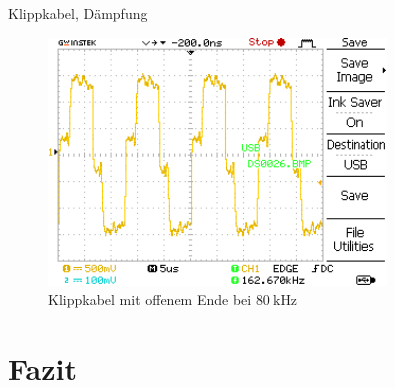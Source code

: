 \documentclass[ngerman]{scrartcl}
\theoremstyle{definition}
\begin{document}
\begin{aufgabe}{Klippkabel, Dämpfung}
\begin{unteraufgabe}
\begin{figure}[H]
					\centering
					\includegraphics[width=0.8\textwidth]{MesswerteVersuch1/DS0026.png}
					\caption{Klippkabel mit offenem Ende bei $\SI{80}{\kilo\hertz}$}
					\label{fig:DS0030}
				\end{figure}
			\end{unteraufgabe}
		\end{aufgabe}
		

	\section{Fazit}
	\printbibliography
\end{document}
